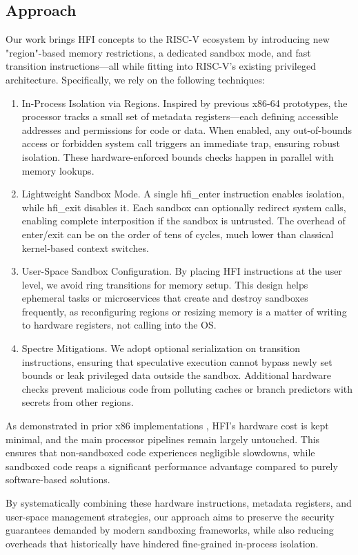 \documentclass[conference,compsoc]{IEEEtran}
\begin{document}
\subsection{Approach}
Our work brings HFI concepts to the RISC-V ecosystem by introducing new "region"-based memory restrictions, a dedicated sandbox mode, and fast transition instructions—all while fitting into RISC-V's existing privileged architecture. Specifically, we rely on the following techniques:
\begin{enumerate}
    \item In-Process Isolation via Regions. Inspired by previous x86-64 prototypes, the processor tracks a small set of metadata registers—each defining accessible addresses and permissions for code or data. When enabled, any out-of-bounds access or forbidden system call triggers an immediate trap, ensuring robust isolation. These hardware-enforced bounds checks happen in parallel with memory lookups.
    \item Lightweight Sandbox Mode. A single hfi\_enter instruction enables isolation, while hfi\_exit disables it. Each sandbox can optionally redirect system calls, enabling complete interposition if the sandbox is untrusted. The overhead of enter/exit can be on the order of tens of cycles, much lower than classical kernel-based context switches.
    \item User-Space Sandbox Configuration. By placing HFI instructions at the user level, we avoid ring transitions for memory setup. This design helps ephemeral tasks or microservices that create and destroy sandboxes frequently, as reconfiguring regions or resizing memory is a matter of writing to hardware registers, not calling into the OS.
    \item Spectre Mitigations. We adopt optional serialization on transition instructions, ensuring that speculative execution cannot bypass newly set bounds or leak privileged data outside the sandbox. Additional hardware checks prevent malicious code from polluting caches or branch predictors with secrets from other regions.
\end{enumerate}


As demonstrated in prior x86 implementations \cite{HFI}, HFI's hardware cost is kept minimal, and the main processor pipelines remain largely untouched. This ensures that non-sandboxed code experiences negligible slowdowns, while sandboxed code reaps a significant performance advantage compared to purely software-based solutions.

By systematically combining these hardware instructions, metadata registers, and user-space management strategies, our approach aims to preserve the security guarantees demanded by modern sandboxing frameworks, while also reducing overheads that historically have hindered fine-grained in-process isolation.
\end{document}
